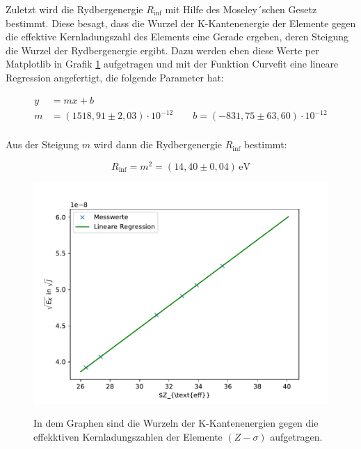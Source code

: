 \documentclass[titlepage = firstcover]{scrartcl}
\begin{document}
            \FloatBarrier
            \noindent
            Zuletzt wird die Rydbergenergie $R_{\text{inf}}$ mit Hilfe des  Moseley´schen Gesetz bestimmt. Diese besagt, dass die Wurzel der K-Kantenenergie der Elemente gegen die effektive 
            Kernladungszahl des Elements eine Gerade ergeben, deren Steigung die Wurzel der Rydbergenergie ergibt. Dazu werden eben diese Werte per Matplotlib in Grafik \ref{fig:Moseley} 
            aufgetragen und mit der Funktion Curvefit eine lineare Regression angefertigt, die folgende Parameter hat:

            \begin{align*}
              y &= mx + b \\
              m &= (1518,91 \pm 2,03) \cdot 10^{-12} \qquad b = (-831,75 \pm 63,60) \cdot 10^{-12} \\
            \end{align*}

            \noindent
            Aus der Steigung $m$ wird dann die Rydbergenergie $R_{\text{inf}}$ bestimmt:

            \begin{equation*}
              R_{\text{inf}} = m^2 = (14,40 \pm 0,04) \, \text{eV}
            \end{equation*}
            
            \FloatBarrier
            \begin{figure}[h]
              \centering
              \caption{In dem Graphen sind die Wurzeln der K-Kantenenergien gegen die effekktiven Kernladungszahlen der Elemente $(Z-\sigma)$ aufgetragen.}
              \includegraphics{Moseley.pdf}
              \label{fig:Moseley}
            \end{figure}
            \FloatBarrier
\end{document}
